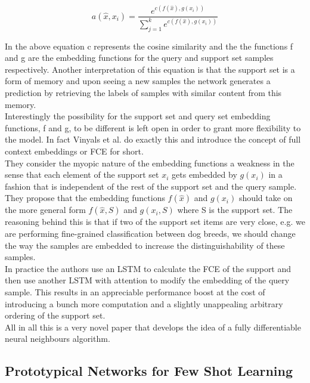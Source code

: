 \begin{equation}
a(\hat{x}, x_i) = \frac{e^{c(f(\hat{x}), g(x_i))}}{\sum_{j=1}^{k} e^{c(f(\hat{x}), g(x_i))}}
\end{equation}

In the above equation c represents the cosine similarity and the the functions f and g are the embedding functions for the query and support set samples respectively. Another interpretation of this equation is that the support set is a form of memory and upon seeing a new samples the network generates a prediction by retrieving the labels of samples with similar content from this memory. \\

Interestingly the possibility for the support set and query set embedding functions, f and g, to be different is left open in order to grant more flexibility to the model. In fact Vinyals et al. do exactly this and introduce the concept of full context embeddings or FCE for short. \\

They consider the myopic nature of the embedding functions a weakness in the sense that each element of the support set $x_i$ gets embedded by $g(x_i)$ in a fashion that is independent of the rest of the support set and the query sample. They propose that the embedding functions $f(\hat{x})$ and $g(x_i)$ should take on the more general form $f(\hat{x}, S)$ and $g(x_i, S)$ where S is the support set. The reasoning behind this is that if two of the support set items are very close, e.g. we are performing fine-grained classification between dog breeds, we should change the way the samples are embedded to increase the distinguishability of these samples. \\

In practice the authors use an LSTM to calculate the FCE of the support and then use another LSTM with attention to modify the embedding of the query sample. This results in an appreciable performance boost at the cost of introducing a bunch more computation and a slightly unappealing arbitrary ordering of the support set. \\

All in all this is a very novel paper that develops the idea of a fully differentiable neural neighbours algorithm.

\subsection{Prototypical Networks for Few Shot Learning}

